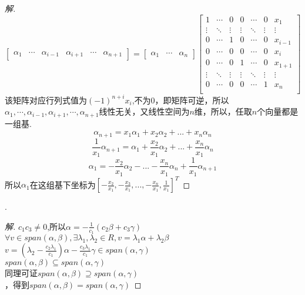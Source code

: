 \documentclass[10pt,a4paper]{report}
\begin{document}
\begin{proof}[解]
	$$
	\left[
	\begin{matrix}
	\alpha_{1} & \cdots & \alpha_{i-1} & \alpha_{i+1} & \cdots & \alpha_{n+1}
	\end{matrix}
	\right] = \left[
	\begin{matrix}
	\alpha_{1} & \cdots & \alpha_{n}
	\end{matrix}
	\right]\left[
	\begin{matrix}
	1 & \cdots & 0 & 0 & \cdots & 0 & x_{1}\\
	\vdots & \ddots & \vdots & \vdots & \ddots & \vdots & \vdots\\
	0 & \cdots & 1 & 0 & \cdots & 0 & x_{i-1}\\
	0 & \cdots & 0 & 0 & \cdots & 0 & x_{i}\\
	0 & \cdots & 0 & 1 & \cdots & 0 & x_{1+1}\\
	\vdots & \ddots & \vdots & \vdots & \ddots & \vdots & \vdots\\
	0 & \cdots & 0 & 0 & \cdots & 1 & x_{n}\\
	\end{matrix}
	\right]
	$$
	该矩阵对应行列式值为$(-1)^{n+i}x_{i}$,不为0，即矩阵可逆，所以$\alpha_{1} , \cdots , \alpha_{i-1} , \alpha_{i+1} , \cdots , \alpha_{n+1}$线性无关，又线性空间为$n$维，所以，任取$n$个向量都是一组基.\\
	$$\alpha_{n+1} = x_{1}\alpha_{1}+x_{2}\alpha_{2}+...+x_{n}\alpha_{n}$$
	$$\frac{1}{x_{1}}\alpha_{n+1} = \alpha_{1}+\frac{x_{2}}{x_{1}}\alpha_{2}+...+\frac{x_{n}}{x_{1}}\alpha_{n}$$
	$$\alpha_{1} = -\frac{x_{2}}{x_{1}}\alpha_{2}-...-\frac{x_{n}}{x_{1}}\alpha_{n} + \frac{1}{x_{1}}\alpha_{n+1}$$
	所以$\alpha_{1}$在这组基下坐标为$[-\frac{x_{2}}{x_{1}}, -\frac{x_{3}}{x_{1}},..., -\frac{x_{n}}{x_{1}},\frac{1}{x_{1}}]^{T}$
\end{proof}
.
\begin{proof}[解]
	$c_{1}c_{3} \neq 0$,所以$\alpha = -\frac{1}{c_{1}}(c_{2}\beta+c_{3}\gamma)$\\
	$\forall v \in span(\alpha,\beta), \exists \lambda_{1}, \lambda_{2} \in R, v=\lambda_{1}\alpha+\lambda_{2}\beta $\\
	$v = (\lambda_{2} - \frac{c_{2}\lambda_{1}}{c_{1}})\alpha-\frac{c_{3}\lambda_{1}}{c_{1}}\gamma \in span(\alpha, \gamma)$\\
	$span(\alpha, \beta) \subseteq span(\alpha,\gamma)$\\
	同理可证$span(\alpha, \beta) \supseteq span(\alpha,\gamma)$\\，得到$span(\alpha, \beta) = span(\alpha,\gamma)$
\end{proof}
\end{document}
